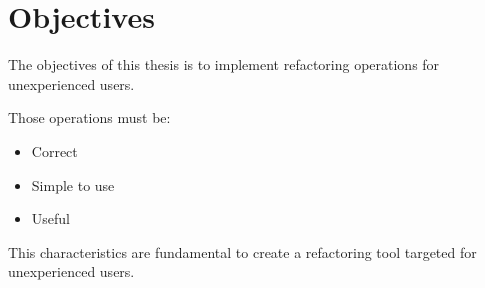 
% 
% 

\section{Objectives}

The objectives of this thesis is to implement refactoring operations for unexperienced users.

Those operations must be:
\begin{itemize}
\item Correct
\item Simple to use
\item Useful
\end{itemize}

This characteristics are fundamental to create a refactoring tool targeted for unexperienced users.